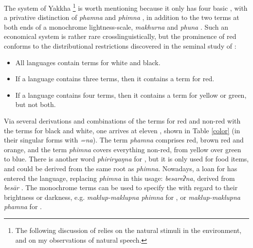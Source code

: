 The system of Yakkha \footnote{The following discussion of  relies on the natural stimuli in the environment, and on my observations of natural speech.} is worth mentioning because it only has four basic , with a privative distinction of \emph{phamna}  and \emph{phimna} , in addition to the two terms at both ends of a monochrome lightness-scale, \emph{makhurna}  and \emph{phuna} . Such an economical system is rather rare crosslinguistically, but the prominence of red conforms to the distributional restrictions discovered in the seminal study of \citet[2-3]{Berlinetal1969Basic}: 

\begin{itemize}
\item All languages contain terms for white and black.
\item If a language contains three terms, then it contains a term for red. 
\item If a language contains four terms, then it contains a term for yellow or green, but not both.
\end{itemize}

Via several derivations and combinations of the terms for red and non-red with the terms for black and white, one arrives at eleven , shown in Table \ref{color} (in their singular forms with \emph{=na}). The term \emph{phamna} comprises  red, brown red and orange, and the term \emph{phimna} covers everything non-red, from yellow over green to blue. There is another word \emph{phiriryaŋna} for , but it is only used for food items, and could be derived from the same root as \emph{phimna}. Nowadays, a  loan for  has entered the language, replacing \emph{phimna} in this usage: \emph{besareʔna}, derived from  \emph{besār} .   The monochrome terms can be used to specify the  with regard to their brightness or darkness, e.g. \emph{maklup-maklupna phimna} for , or \emph{maklup-maklupna phamna} for . 



